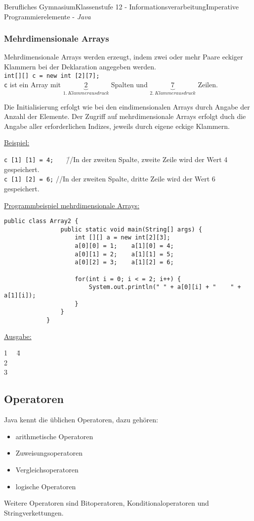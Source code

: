 \documentclass[oneside,openany,headings=optiontotoc,11pt,numbers=noenddot]{article}
\begin{document}
\begin{worksheet}{Berufliches Gymnasium}{Klassenstufe 12 - Informationsverarbeitung}{Imperative Programmierelemente - \textit{Java}}
		\subsubsection{Mehrdimensionale Arrays}
		Mehrdimensionale Arrays werden erzeugt, indem zwei oder mehr Paare eckiger Klammern bei der Deklaration angegeben werden.\\
		\lstinline[style=JavaInpuTStyle]|int[][] c = new int [2][7];|\\
		\lstinline[style=JavaInpuTStyle]|c| ist ein Array mit $\underbrace{2}_{1.\ Klammerausdruck}$ Spalten und $\underbrace{7}_{2.\ Klammerausdruck}$ Zeilen.\\
		\par\noindent
		Die Initialisierung erfolgt wie bei den eindimensionalen Arrays durch Angabe der Anzahl der Elemente. Der Zugriff auf mehrdimensionale Arrays erfolgt duch die Angabe aller erforderlichen Indizes, jeweils durch eigene eckige Klammern.\\
		\par\noindent
		\underline{Beispiel:}
		\begin{tabbing}
			\lstinline[style=JavaInputStyle]|c [1] [1] = 4;|~~~ \= //In der zweiten Spalte, zweite Zeile wird der Wert 4 gespeichert.\\
			\lstinline[style=JavaInputStyle]|c [1] [2] = 6;| \> //In der zweiten Spalte, dritte Zeile wird der Wert 6 gespeichert.
		\end{tabbing}
		\par\noindent
		\underline{Programmbeispiel mehrdimensionale Arrays:}
		\begin{lstlisting}[style=JavaInputStyle]
			public class Array2 {
				public static void main(String[] args) {
					int [][] a = new int[2][3];
					a[0][0] = 1; 	a[1][0] = 4;
					a[0][1] = 2;	a[1][1] = 5;
					a[0][2] = 3;	a[1][2] = 6;
					
					for(int i = 0; i < = 2; i++) {
						System.out.println(" " + a[0][i] + "	" + a[1][i]);
					}
				}
			}
		\end{lstlisting}
		\par\noindent
		\underline{Ausgabe:}
		\begin{tabbing}
			1~~ \= 4\\
			2 \> 5\\
			3 \> 6
		\end{tabbing}
		\subsection{Operatoren}
		Java kennt die \grqq{}üblichen\grqq{} Operatoren, dazu gehören:
		\begin{itemize}
			\item arithmetische Operatoren
			\item Zuweisungsoperatoren
			\item Vergleichsoperatoren
			\item logische Operatoren
		\end{itemize}
		Weitere Operatoren sind Bitoperatoren, Konditionaloperatoren und Stringverkettungen.

\end{worksheet}
\end{document}
